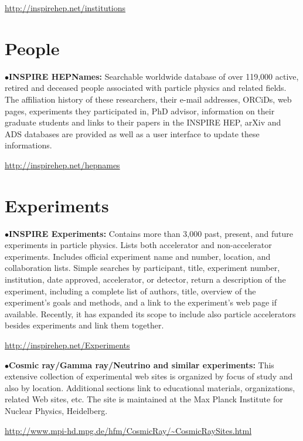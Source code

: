 	\item{}\qquad\url{http://inspirehep.net/institutions}


\section{People} %


\item{$\bullet$}{\bf INSPIRE HEPNames:}
Searchable worldwide database of over 119,000 active, retired and deceased people associated with particle physics and related fields. The affiliation history of these researchers, their e-mail addresses, ORCiDs, web pages, experiments they participated in, PhD advisor, information on their graduate students and links to their papers in the INSPIRE HEP, arXiv and ADS databases are provided as well as a user interface to update these informations.

	\item{}\qquad\url{http://inspirehep.net/hepnames}



\section{Experiments}  %

\item{$\bullet$}{\bf INSPIRE Experiments:}
Contains more than 3,000 past, present, and future experiments in particle physics. Lists both accelerator and non-accelerator experiments. Includes official experiment name and number, location, and collaboration lists. Simple searches by participant, title, experiment number, institution, date approved, accelerator, or detector, return a description of the experiment, including a complete list of authors, title, overview of the experiment's goals and methods, and a link to the experiment's web page if available.
Recently, it has expanded its scope to include also particle accelerators besides experiments and link them together.

	\item{}\qquad\url{http://inspirehep.net/Experiments}

\medskip

\item{$\bullet$}{\bf Cosmic ray/Gamma ray/Neutrino and similar experiments:}
This extensive collection of experimental web sites is organized by focus of study and also by location. Additional sections link to educational materials, organizations, related Web sites, etc. The site is maintained at the Max Planck Institute for Nuclear Physics, Heidelberg.
	\item{}\qquad\url{http://www.mpi-hd.mpg.de/hfm/CosmicRay/~CosmicRaySites.html}

